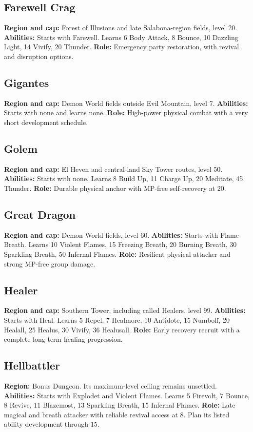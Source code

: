 \subsection{Farewell Crag}
\textbf{Region and cap:} Forest of Illusions and late Salabona-region fields, level 20.
\textbf{Abilities:} Starts with Farewell. Learns 6 Body Attack, 8 Bounce,
10 Dazzling Light, 14 Vivify, 20 Thunder.
\textbf{Role:} Emergency party restoration, with revival and disruption options.

\subsection{Gigantes}
\textbf{Region and cap:} Demon World fields outside Evil Mountain, level 7.
\textbf{Abilities:} Starts with none and learns none.
\textbf{Role:} High-power physical combat with a very short development schedule.

\subsection{Golem}
\textbf{Region and cap:} El Heven and central-land Sky Tower routes, level 50.
\textbf{Abilities:} Starts with none. Learns 8 Build Up, 11 Charge Up,
20 Meditate, 45 Thunder.
\textbf{Role:} Durable physical anchor with MP-free self-recovery at 20.

\subsection{Great Dragon}
\textbf{Region and cap:} Demon World fields, level 60.
\textbf{Abilities:} Starts with Flame Breath. Learns 10 Violent Flames,
15 Freezing Breath, 20 Burning Breath, 30 Sparkling Breath, 50 Infernal Flames.
\textbf{Role:} Resilient physical attacker and strong MP-free group damage.

\subsection{Healer}
\textbf{Region and cap:} Southern Tower, including called Healers, level 99.
\textbf{Abilities:} Starts with Heal. Learns 5 Repel, 7 Healmore,
10 Antidote, 15 Numboff, 20 Healall, 25 Healus, 30 Vivify, 36 Healusall.
\textbf{Role:} Early recovery recruit with a complete long-term healing progression.

\subsection{Hellbattler}
\textbf{Region:} Bonus Dungeon. Its maximum-level ceiling remains unsettled.
\textbf{Abilities:} Starts with Explodet and Violent Flames. Learns 5 Firevolt,
7 Bounce, 8 Revive, 11 Blazemost, 13 Sparkling Breath, 15 Infernal Flames.
\textbf{Role:} Late magical and breath attacker with reliable revival access at 8.
Plan its listed ability development through 15.

